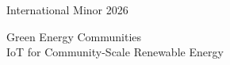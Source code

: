 \begin{frame}
\centering
\vfill
{\color{fh-ooe-red}\Huge International Minor 2026\par}
\vspace{1em}
{\color{fh-ooe-red}\Large Green Energy Communities\\IoT for Community-Scale Renewable Energy\par}
\vfill
\end{frame}
